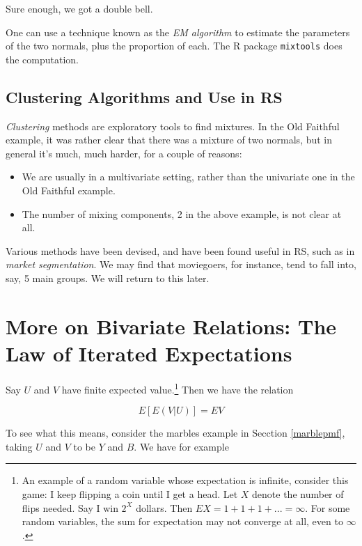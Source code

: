 Sure enough, we got a double bell.

One can use a technique known as the \textit{EM algorithm} to estimate
the parameters of the two normals, plus the proportion of each.  The R
package \lstinline{mixtools} does the computation.

\subsection{Clustering Algorithms and Use in RS}

\textit{Clustering} methods are exploratory tools to find mixtures.  In
the Old Faithful example, it was rather clear that there was a mixture
of two normals, but in general it's much, much harder, for a couple of
reasons:

\begin{itemize}

\item We are usually in a multivariate setting, rather than the
univariate one in the Old Faithful example.

\item The number of mixing components, 2 in the above example, is not
clear at all.

\end{itemize} 

Various methods have been devised, and have been found useful in RS,
such as in \textit{market segmentation}.  We may find that moviegoers,
for instance, tend to fall into, say, 5 main groups.  We will return to
this later.

\section{More on Bivariate Relations:  The Law of Iterated Expectations}
\label{iterexp}

Say $U$ and $V$ have finite expected value.\footnote{An example of a
random variable whose expectation is infinite, consider this game:  I
keep flipping a coin until I get a head.  Let $X$ denote the number of
flips needed.  Say I win $2^X$ dollars.  Then $EX = 1 + 1 + 1 + ... =
\infty$.  For some random variables, the sum for expectation may not converge 
at all, even to $\infty$.}  Then we have the relation

\begin{equation}
\label{adam}
E \left [ E(V|U) \right ] = EV
\end{equation}

To see what this means, consider the marbles example in Secction
\ref{marblepmf}, taking $U$ and $V$ to be $Y$ and $B$.  We have for
example

